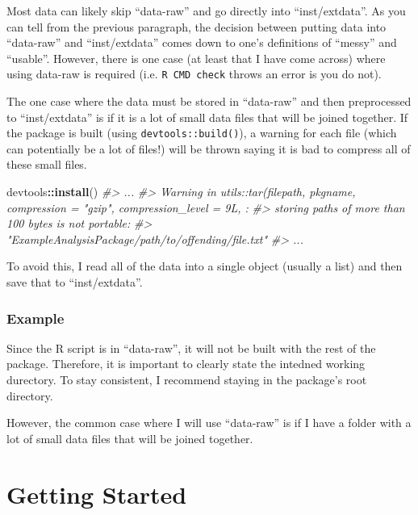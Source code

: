 \documentclass[]{book}
\newenvironment{Shaded}{\begin{snugshade}}{\end{snugshade}}
\newcommand{\CommentTok}[1]{\textcolor[rgb]{0.56,0.35,0.01}{\textit{#1}}}
\newcommand{\KeywordTok}[1]{\textcolor[rgb]{0.13,0.29,0.53}{\textbf{#1}}}
\newcommand{\NormalTok}[1]{#1}
\newcommand{\OperatorTok}[1]{\textcolor[rgb]{0.81,0.36,0.00}{\textbf{#1}}}
\begin{document}
Most data can likely skip ``data-raw'' and go directly into ``inst/extdata''. As you can tell from the previous paragraph, the decision between putting data into ``data-raw'' and ``inst/extdata'' comes down to one's definitions of ``messy'' and ``usable''. However, there is one case (at least that I have come across) where using data-raw is required (i.e. \texttt{R\ CMD\ check} throws an error is you do not).

The one case where the data must be stored in ``data-raw'' and then preprocessed to ``inst/extdata'' is if it is a lot of small data files that will be joined together. If the package is built (using \texttt{devtools::build()}), a warning for each file (which can potentially be a lot of files!) will be thrown saying it is bad to compress all of these small files.

\begin{Shaded}
\begin{Highlighting}[]
\NormalTok{devtools}\OperatorTok{::}\KeywordTok{install}\NormalTok{()}
\CommentTok{#> ...}
\CommentTok{#> Warning in utils::tar(filepath, pkgname, compression = "gzip", compression_level = 9L,  :}
\CommentTok{#>      storing paths of more than 100 bytes is not portable:}
\CommentTok{#>      "ExampleAnalysisPackage/path/to/offending/file.txt"}
\CommentTok{#> ...}
\end{Highlighting}
\end{Shaded}

To avoid this, I read all of the data into a single object (usually a list) and then save that to ``inst/extdata''.

\hypertarget{example}{%
\subsection{Example}\label{example}}

Since the R script is in ``data-raw'', it will not be built with the rest of the package. Therefore, it is important to clearly state the intedned working durectory. To stay consistent, I recommend staying in the package's root directory.

However, the common case where I will use ``data-raw'' is if I have a folder with a lot of small data files that will be joined together.

\hypertarget{getting-started}{%
\chapter{Getting Started}\label{getting-started}}
\end{document}
